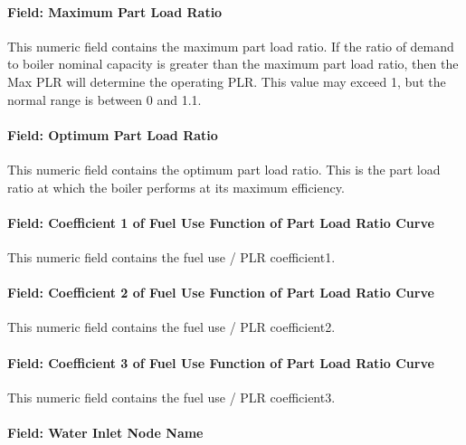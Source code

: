 \paragraph{Field: Maximum Part Load Ratio}\label{field-maximum-part-load-ratio-10}

This numeric field contains the maximum part load ratio. If the ratio of demand to boiler nominal capacity is greater than the maximum part load ratio, then the Max PLR will determine the operating PLR. This value may exceed 1, but the normal range is between 0 and 1.1.

\paragraph{Field: Optimum Part Load Ratio}\label{field-optimum-part-load-ratio-10}

This numeric field contains the optimum part load ratio. This is the part load ratio at which the boiler performs at its maximum efficiency.

\paragraph{Field: Coefficient 1 of Fuel Use Function of Part Load Ratio Curve}\label{field-coefficient-1-of-fuel-use-function-of-part-load-ratio-curve}

This numeric field contains the fuel use / PLR coefficient1.

\paragraph{Field: Coefficient 2 of Fuel Use Function of Part Load Ratio Curve}\label{field-coefficient-2-of-fuel-use-function-of-part-load-ratio-curve}

This numeric field contains the fuel use / PLR coefficient2.

\paragraph{Field: Coefficient 3 of Fuel Use Function of Part Load Ratio Curve}\label{field-coefficient-3-of-fuel-use-function-of-part-load-ratio-curve}

This numeric field contains the fuel use / PLR coefficient3.

\paragraph{Field: Water Inlet Node Name}\label{field-water-inlet-node-name-001}

